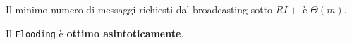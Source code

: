 \begin{theorem}
    Il minimo numero di messaggi richiesti dal broadcasting sotto $RI+$
    è $\Theta(m)$.
\end{theorem}

Il \texttt{Flooding} è \textbf{ottimo asintoticamente}.



